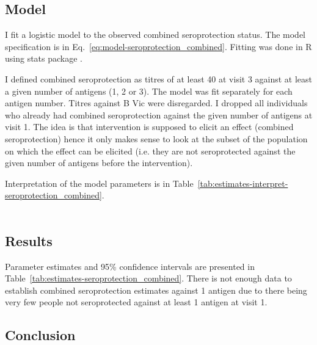 \documentclass[11pt]{article}
\begin{document}
\subsection{Model}

I fit a logistic model to the observed combined seroprotection status.
The model specification is in Eq.~\ref{eq:model-seroprotection_combined}.
Fitting was done in R using stats package \cite{R}.

I defined combined seroprotection as titres of at least 40 at visit 3 against
at least a given number of antigens (1, 2 or 3). The model was fit separately
for each antigen number.
Titres against B Vic were disregarded.
I dropped all individuals who already had combined seroprotection against
the given number of antigens at visit 1.
The idea is that intervention is supposed to elicit an effect
(combined seroprotection)
hence it only makes sense to look at the subset of the population on which
the effect can be elicited
(i.e. they are not seroprotected against the given number of antigens
before the intervention).

Interpretation of the model parameters is in
Table~\ref{tab:estimates-interpret-seroprotection_combined}.

\begin{equation}
    \begin{gathered}
        \label{eq:model-seroprotection_combined}
        
    \end{gathered}
\end{equation}





\subsection{Results}

Parameter estimates and 95\% confidence intervals
are presented in Table~\ref{tab:estimates-seroprotection_combined}.
There is not enough data to establish combined seroprotection
estimates against 1 antigen due to there being very few people
not seroprotected against at least 1 antigen at visit 1.



\subsection{Conclusion}
\end{document}
